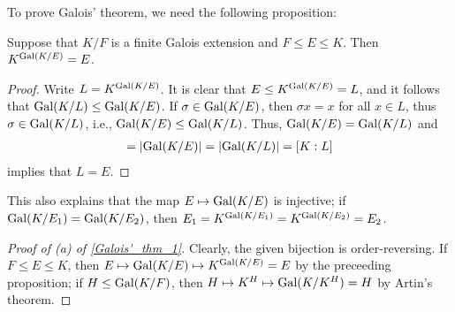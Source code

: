To prove Galois' theorem, we need the following proposition:
\begin{prop}
    Suppose that $K/F$ is a finite Galois extension and $F\leq E\leq K$.
    Then $K^{{\textrm{Gal}({K/E})}}=E$.
\end{prop}
\begin{proof}
    Write $L=K^{\textrm{Gal}({K/E})}$.
    It is clear that $E\leq K^{\textrm{Gal}({K/E})}=L$, and it follows that ${\textrm{Gal}({K/L})}\leq{\textrm{Gal}({K/E})}$.
    If $\sigma\in{\textrm{Gal}({K/E})}$, then $\sigma x=x$ for all $x\in L$, thus $\sigma\in{\textrm{Gal}({K/L})}$, i.e., ${\textrm{Gal}({K/E})}\leq{\textrm{Gal}({K/L})}$.
    Thus, ${\textrm{Gal}({K/E})}={\textrm{Gal}({K/L})}$ and
    \begin{align*}
        [K:E]=|\gal{K/E}|=|\gal{K/L}|=[K:L]
    \end{align*}
    implies that $L=E$.
\end{proof}
\begin{rmk}
    This also explains that the map $E\mapsto{\textrm{Gal}({K/E})}$ is injective; if ${\textrm{Gal}({K/E_1})}={\textrm{Gal}({K/E_2})}$, then $E_1=K^{{\textrm{Gal}({K/E_1})}}=K^{{\textrm{Gal}({K/E_2})}}=E_2$.
\end{rmk}
\begin{proof}[Proof of (a) of \cref{Galois'_thm_1}]
    Clearly, the given bijection is order-reversing.
    If $F\leq E\leq K$, then $E\mapsto{\textrm{Gal}({K/E})}\mapsto K^{\textrm{Gal}({K/E})}=E$ by the preceeding proposition; if $H\leq{\textrm{Gal}({K/F})}$, then $H\mapsto K^H\mapsto{\textrm{Gal}({K/K^H})}=H$ by Artin's theorem.
\end{proof}

